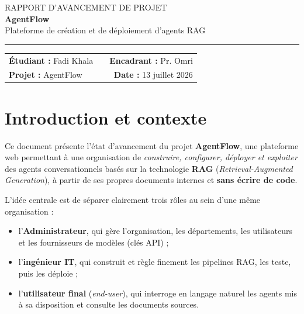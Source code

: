 \documentclass[11pt,a4paper]{article}
\begin{document}
\begin{center}
  {\color{soft}\small RAPPORT D'AVANCEMENT DE PROJET}\\[6pt]
  {\color{ink}\LARGE\bfseries AgentFlow}\\[4pt]
  {\color{primary}\large Plateforme de création et de déploiement d'agents RAG}\\[10pt]
  \color{line}\rule{\linewidth}{0.8pt}
\end{center}

\vspace{2pt}
\noindent
\begin{tabularx}{\linewidth}{@{}l X r@{}}
  \small\color{soft}\textbf{Étudiant :} \small Fadi Khala &
  &
  \small\color{soft}\textbf{Encadrant :} \small Pr. Omri \\
  \small\color{soft}\textbf{Projet :} \small AgentFlow &
  &
  \small\color{soft}\textbf{Date :} \small 13 juillet 2026 \\
\end{tabularx}
\vspace{6pt}

\section{Introduction et contexte}

Ce document présente l'état d'avancement du projet \textbf{AgentFlow}, une
plateforme web permettant à une organisation de \emph{construire, configurer,
déployer et exploiter} des agents conversationnels basés sur la technologie
\textbf{RAG} (\emph{Retrieval-Augmented Generation}), à partir de ses propres
documents internes et \textbf{sans écrire de code}.

L'idée centrale est de séparer clairement trois rôles au sein d'une même
organisation :
\begin{itemize}
  \item l'\textbf{Administrateur}, qui gère l'organisation, les départements,
        les utilisateurs et les fournisseurs de modèles (clés API) ;
  \item l'\textbf{ingénieur IT}, qui construit et règle finement les pipelines
        RAG, les teste, puis les déploie ;
  \item l'\textbf{utilisateur final} (\emph{end-user}), qui interroge en langage
        naturel les agents mis à sa disposition et consulte les documents
        sources.
\end{itemize}
\end{document}
